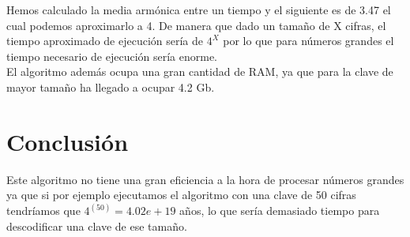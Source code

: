 Hemos calculado la media armónica entre un tiempo y el siguiente es de 3.47 el cual podemos aproximarlo a 4. De manera que dado un tamaño de X cifras, el tiempo aproximado de ejecución sería de $4^X$ por lo que para números grandes el tiempo necesario de ejecución sería enorme.\\

El algoritmo además ocupa una gran cantidad de RAM, ya que para la clave de mayor tamaño ha llegado a ocupar 4.2 Gb.\\

\section*{Conclusión}

Este algoritmo no tiene una gran eficiencia a la hora de procesar números grandes ya que si por ejemplo ejecutamos el algoritmo con una clave de 50 cifras tendríamos que $4^(50) = 4.02 e+19$ años, lo que sería demasiado tiempo para descodificar una clave de ese tamaño.\\








